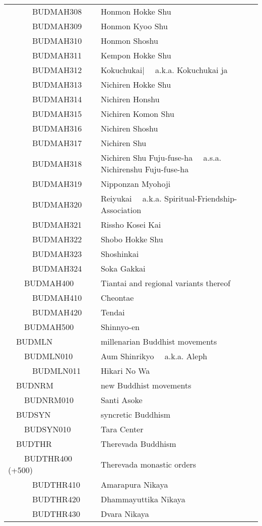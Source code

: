 \documentclass[12pt]{article}
\begin{document}
\begin{tiny}
\begin{center}
\begin{longtable}{|l|l|}
~~~~~~BUDMAH308 & Honmon Hokke Shu \\
~~~~~~BUDMAH309 & Honmon Kyoo Shu \\
~~~~~~BUDMAH310 & Honmon Shoshu \\
~~~~~~BUDMAH311 & Kempon Hokke Shu \\
~~~~~~BUDMAH312 & Kokuchukai|	~~a.k.a. Kokuchukai ja \\
~~~~~~BUDMAH313 & Nichiren Hokke Shu \\
~~~~~~BUDMAH314 & Nichiren Honshu \\
~~~~~~BUDMAH315 & Nichiren Komon Shu \\
~~~~~~BUDMAH316 & Nichiren Shoshu \\
~~~~~~BUDMAH317 & Nichiren Shu \\
~~~~~~BUDMAH318 & Nichiren Shu Fuju-fuse-ha	~~a.s.a. Nichirenshu Fuju-fuse-ha \\
~~~~~~BUDMAH319 & Nipponzan Myohoji \\
~~~~~~BUDMAH320 & Reiyukai	~~a.k.a. Spiritual-Friendship-Association \\
~~~~~~BUDMAH321 & Rissho Kosei Kai \\
~~~~~~BUDMAH322 & Shobo Hokke Shu \\
~~~~~~BUDMAH323 & Shoshinkai \\
~~~~~~BUDMAH324 & Soka Gakkai \\
~~~~BUDMAH400 & Tiantai and regional variants thereof \\
~~~~~~BUDMAH410 & Cheontae \\
~~~~~~BUDMAH420 & Tendai \\
~~~~BUDMAH500 & Shinnyo-en \\
~~BUDMLN & millenarian Buddhist movements \\
~~~~BUDMLN010 & Aum Shinrikyo	~~a.k.a. Aleph \\
~~~~~~BUDMLN011 & Hikari No Wa \\
~~BUDNRM & new Buddhist movements \\
~~~~BUDNRM010 & Santi Asoke \\
~~BUDSYN & syncretic Buddhism \\
~~~~BUDSYN010 & Tara Center \\
~~BUDTHR & Therevada Buddhism \\
~~~~BUDTHR400 (+500) & Therevada monastic orders \\
~~~~~~BUDTHR410 & Amarapura Nikaya \\
~~~~~~BUDTHR420 & Dhammayuttika Nikaya \\
~~~~~~BUDTHR430 & Dvara Nikaya \\

\end{longtable}
\end{center}
\end{tiny}
\end{document}
